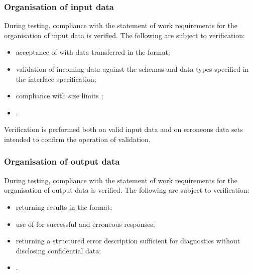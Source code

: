 \documentclass[12pt,a4paper]{extarticle}
\begin{document}


\clearpage

\subsubsection{Organisation of input data}

\begin{hseExample}
During testing, compliance with the statement of work requirements for the organisation of input data is verified. The following are subject to verification:

\begin{itemize}[leftmargin=1.25cm]
    \item acceptance of  with data transferred in the  format;
    \item validation of incoming data against the schemas and data types specified in the interface specification;
    \item compliance with size limits ;
    \item {}.
\end{itemize}

Verification is performed both on valid input data and on erroneous data sets intended to confirm the operation of validation.
\end{hseExample}

\subsubsection{Organisation of output data}

\begin{hseExample}
During testing, compliance with the statement of work requirements for the organisation of output data is verified. The following are subject to verification:

\begin{itemize}[leftmargin=1.25cm]
    \item returning results in the  format;
    \item use of  for successful and erroneous responses;
    \item returning a structured error description sufficient for diagnostics without disclosing confidential data;
    \item {}.
\end{itemize}
\end{hseExample}
\end{document}
